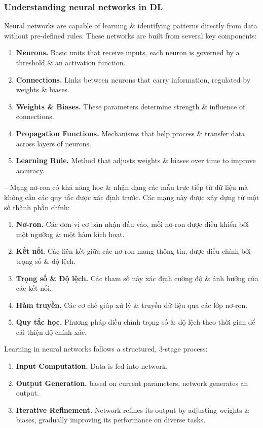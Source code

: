 \documentclass{article}
\begin{document}
\subsubsection{Understanding neural networks in DL}
Neural networks are capable of learning \& identifying patterns directly from data without pre-defined rules. These networks are built from several key components:
\begin{enumerate}
    \item {\bf Neurons.} Basic units that receive inputs, each neuron is governed by a threshold \& an activation function.
    \item {\bf Connections.} Links between neurons that carry information, regulated by weights \& biases.
    \item {\bf Weights \& Biases.} These parameters determine strength \& influence of connections.
    \item {\bf Propagation Functions.} Mechanisms that help process \& transfer data across layers of neurons.
    \item {\bf Learning Rule.} Method that adjusts weights \& biases over time to improve accuracy.
\end{enumerate}
-- Mạng nơ-ron có khả năng học \& nhận dạng các mẫu trực tiếp từ dữ liệu mà không cần các quy tắc được xác định trước. Các mạng này được xây dựng từ một số thành phần chính:
\begin{enumerate}
    \item {\bf Nơ-ron.} Các đơn vị cơ bản nhận đầu vào, mỗi nơ-ron được điều khiển bởi một ngưỡng \& một hàm kích hoạt.
    \item {\bf Kết nối.} Các liên kết giữa các nơ-ron mang thông tin, được điều chỉnh bởi trọng số \& độ lệch.
    \item {\bf Trọng số \& Độ lệch.} Các tham số này xác định cường độ \& ảnh hưởng của các kết nối.
    \item {\bf Hàm truyền.} Các cơ chế giúp xử lý \& truyền dữ liệu qua các lớp nơ-ron.
    \item {\bf Quy tắc học.} Phương pháp điều chỉnh trọng số \& độ lệch theo thời gian để cải thiện độ chính xác.
\end{enumerate}
Learning in neural networks follows a structured, 3-stage process:
\begin{enumerate}
    \item {\bf Input Computation.} Data is fed into network.
    \item {\bf Output Generation.} based on current parameters, network generates an output.
    \item {\bf Iterative Refinement.} Network refines its output by adjusting weights \& biases, gradually improving its performance on diverse tasks.
\end{enumerate}
\end{document}
